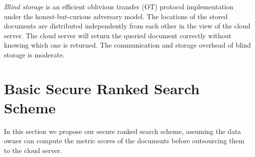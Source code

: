 \documentclass{IEEEtran}
\begin{document}
\emph{Blind storage} \cite{NPG14} is an efficient oblivious transfer (OT) protocol implementation under the honest-but-curious adversary model. The locations of the stored documents are distributed independently from each other in the view of the cloud server. The cloud server will return the queried document correctly without knowing which one is returned. The communication and storage overhead of blind storage is moderate.


\section{Basic Secure Ranked Search Scheme}
In this section we propose our secure ranked search scheme, assuming the data owner can compute the metric scores of the documents before outsourcing them to the cloud server.

\newcommand{\Enc}{\textsf{Enc}}
\end{document}
